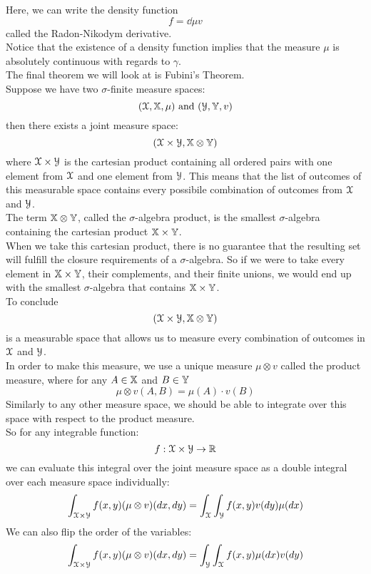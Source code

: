 \documentclass[12pt]{article}
\begin{document}
    Here, we can write the density function
    \[ f = \dd{\mu}{v} \]
    called the Radon-Nikodym derivative. \\

    Notice that the existence of a 
    density function implies that the measure
    $\mu$ is absolutely continuous
    with regards to $\gamma$. \\

    The final theorem we will look
    at is Fubini's Theorem. \\
    Suppose we have two $\sigma$-finite
    measure spaces:
    \[ (\mathcal{X}, \mathbb{X}, \mu)
    \text{ and } (\mathcal{Y}, \mathbb{Y}, v) \]
    then there exists a joint measure
    space:
    \[ (\mathcal{X} \times \mathcal{Y}, 
    \mathbb{X} \otimes \mathbb{Y}) \]
    where $\mathcal{X} \times \mathcal{Y}$
    is the cartesian product containing
    all ordered pairs with one element
    from $\mathcal{X}$ and one element from $\mathcal{Y}$.
    This means that the list of outcomes
    of this measurable space contains
    every possibile combination of outcomes
    from $\mathcal{X}$ and $\mathcal{Y}$. \\
    The term $\mathbb{X} \otimes \mathbb{Y}$,
    called the $\sigma$-algebra product,
    is the smallest $\sigma$-algebra
    containing the cartesian product
    $\mathbb{X} \times \mathbb{Y}$. \\
    When we take this cartesian product,
    there is no guarantee that the resulting
    set will fulfill the closure requirements
    of a $\sigma$-algebra.
    So if we were to take every element in
    $\mathbb{X} \times \mathbb{Y}$, their complements,
    and their finite unions,
    we would end up with the smallest $\sigma$-algebra
    that contains $\mathbb{X} \times \mathbb{Y}$. \\
    To conclude 
    \[ (\mathcal{X} \times \mathcal{Y}, \mathbb{X} \otimes \mathbb{Y}) \]
    is a measurable space that allows us
    to measure every combination of outcomes
    in $\mathcal{X}$ and $\mathcal{Y}$. \\
    In order to make this measure,
    we use a unique measure $\mu \otimes v$
    called the product measure,
    where for any $A \in \mathbb{X}$ and
    $B \in \mathbb{Y}$
    \[ \mu \otimes v(A, B) =
    \mu(A) \cdot v(B)  \]
    Similarly to any other measure space,
    we should be able to integrate
    over this space with respect to
    the product measure. \\
    So for any integrable function:
    \[ f:\mathcal{X} \times \mathcal{Y}
    \to \mathbb{R} \]
    we can evaluate this integral
    over the joint measure space
    as a double integral
    over each measure space individually:
    \[ \int_{\mathcal{X} \times \mathcal{Y}}
    f(x,y)(\mu \otimes v)(dx, dy)
    = \int_{\mathcal{X}}  \int_{\mathcal{Y}}
    f(x,y)v(dy)\mu(dx) \]
    We can also flip the order of the variables:
    \[ \int_{\mathcal{X} \times \mathcal{Y}}
    f(x,y)(\mu \otimes v)(dx, dy)
    = \int_{\mathcal{Y}}  \int_{\mathcal{X}}
    f(x,y)\mu(dx)v(dy) \] \\
\end{document}

